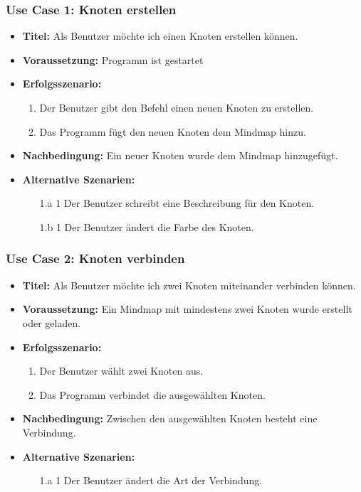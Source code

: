 \subsubsection{Use Case 1: Knoten erstellen}
\begin{itemize}
\item \textbf{Titel:} Als Benutzer möchte ich einen Knoten erstellen können.
\item \textbf{Voraussetzung:} Programm ist gestartet
\item \textbf{Erfolgsszenario:}
	\begin{enumerate}
	\item Der Benutzer gibt den Befehl einen neuen Knoten zu erstellen.
	\item Das Programm fügt den neuen Knoten dem Mindmap hinzu.
	\end{enumerate}
\item \textbf{Nachbedingung:} Ein neuer Knoten wurde dem Mindmap hinzugefügt.
\item \textbf{Alternative Szenarien:}
	\begin{enumerate}
	\item [1.a 1] Der Benutzer schreibt eine Beschreibung für den Knoten.
	\item []
	\item [1.b 1] Der Benutzer ändert die Farbe des Knoten.
	\end{enumerate}
\end{itemize}

\subsubsection{Use Case 2: Knoten verbinden}
\begin{itemize}
\item \textbf{Titel:} Als Benutzer möchte ich zwei Knoten miteinander verbinden können.
\item \textbf{Voraussetzung:} Ein Mindmap mit mindestens zwei Knoten wurde erstellt oder geladen.
\item \textbf{Erfolgsszenario:}
	\begin{enumerate}
	\item Der Benutzer wählt zwei Knoten aus.
	\item Das Programm verbindet die ausgewählten Knoten.
	\end{enumerate}
\item \textbf{Nachbedingung:} Zwischen den ausgewählten Knoten besteht eine Verbindung.
\item \textbf{Alternative Szenarien:}
	\begin{enumerate}
	\item [1.a 1] Der Benutzer ändert die Art der Verbindung.
	\end{enumerate}
\end{itemize}

